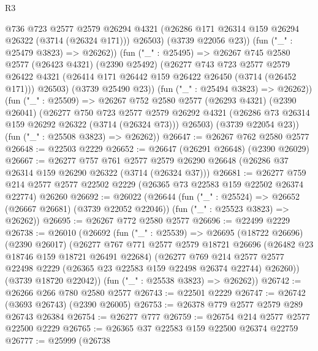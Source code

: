 \begin{lexlean}{R3}
\begin{coremodule}
              @736
              @723
              @2577
              @2579
              @26294
              @4321
              (@26286 @171 @26314 @159 @26294 @26322 (@3714 (@26324 @171)))
              @26503)
            (@3739 @22056 @23))
          (fun ("_" : @25479 @3823) => @26262))
        (fun ("_" : @25495) =>
        @26267
          @745
          @2580
          @2577
          (@26423 @4321)
          (@2390 @25492)
          (@26277
            @743
            @723
            @2577
            @2579
            @26422
            @4321
            (@26414 @171 @26442 @159 @26422 @26450 (@3714 (@26452 @171)))
            @26503)
          (@3739 @25490 @23))
        (fun ("_" : @25494 @3823) => @26262))
      (fun ("_" : @25509) =>
      @26267
        @752
        @2580
        @2577
        (@26293 @4321)
        (@2390 @26041)
        (@26277
          @750
          @723
          @2577
          @2579
          @26292
          @4321
          (@26286 @73 @26314 @159 @26292 @26322 (@3714 (@26324 @73)))
          @26503)
        (@3739 @22054 @23))
      (fun ("_" : @25508 @3823) => @26262))
@26647 := @26267 @762 @2580 @2577
@26648 := @22503 @2229
@26652 := @26647 (@26291 @26648) (@2390 @26029)
@26667 := @26277
    @757
    @761
    @2577
    @2579
    @26290
    @26648
    (@26286 @37 @26314 @159 @26290 @26322 (@3714 (@26324 @37)))
@26681 := @26277
    @759
    @214
    @2577
    @2577
    @22502
    @2229
    (@26365 @73 @22583 @159 @22502 @26374 @22774)
    @26260
@26692 := @26022
    (@26644
      (fun ("_" : @25524) => @26652 (@26667 @26681) (@3739 @22052 @22046))
      (fun ("_" : @25523 @3823) => @26262))
@26695 := @26267 @772 @2580 @2577
@26696 := @22499 @2229
@26738 := @26010
    (@26692
      (fun ("_" : @25539) =>
      @26695
        (@18722 @26696)
        (@2390 @26017)
        (@26277
          @767
          @771
          @2577
          @2579
          @18721
          @26696
          (@26482 @23 @18746 @159 @18721 @26491 @22684)
          (@26277
            @769
            @214
            @2577
            @2577
            @22498
            @2229
            (@26365 @23 @22583 @159 @22498 @26374 @22744)
            @26260))
        (@3739 @18720 @22042))
      (fun ("_" : @25538 @3823) => @26262))
@26742 := @26266 @266 @780 @2580 @2577
@26743 := @22501 @2229
@26747 := @26742 (@3693 @26743) (@2390 @26005)
@26753 := @26378 @779 @2577 @2579 @289 @26743 @26384
@26754 := @26277 @777
@26759 := @26754 @214 @2577 @2577 @22500 @2229
@26765 := @26365 @37 @22583 @159 @22500 @26374 @22759
@26777 := @25999
    (@26738

\end{coremodule}
\end{lexlean}
